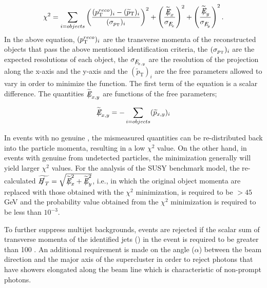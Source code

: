 \begin{equation}\label{eq:1ab}
   \chi^2 = \sum_{i=objects} \left( \frac{(\PT^{reco})_i-(\widetilde{p}_{\mathrm{T}})_i}{(\sigma_{\PT})_i} \right)^2 + \left( \frac{\widetilde{\Em}_x}{\sigma_{{\Em}_x}}\right)^2  + \left( \frac{\widetilde{\Em}_y}{\sigma_{{\Em}_y}}\right)^2.
\end{equation} 
In the above equation, $(p_{\mathrm{T}}^{reco})_{i}$ are the transverse  momenta of the reconstructed objects that pass the above mentioned identification criteria, the $(\sigma_{p_{\mathrm{T}}})_{i}$ are the expected resolutions of each object, the $\sigma_{{E\hspace{-0.6em}/}_{x,y}}$ are the resolution of the \met projection along the x-axis and the y-axis and the $(\widetilde{p}_{\mathrm T})_{i}$ are the free parameters allowed to vary in order to minimize the function. The first term of the equation is a scalar difference. The quantities $\widetilde{E\hspace{-0.6em}/}_{x,y}$ are functions of the free parameters;
  
\begin{eqnarray}
\widetilde{\Em}_{x,y} =  - \sum_{i=objects} (\widetilde{p}_{x,y})_i %
\end{eqnarray}

    In events with no genuine \met, the mismeasured quantities can be re-distributed back into the particle momenta, resulting in a low $\chi^{2}$ value. On the other hand, in events with genuine \met from undetected particles, the minimization generally will yield larger $\chi^{2}$ values. For the analysis of the SUSY benchmark model, the re-calculated $\widetilde{\met} = \sqrt{\widetilde{\Em}_{x}^2 + \widetilde{\Em}_{y}^2}$, i.e., in which the original object momenta are replaced with those obtained with the $\chi^{2}$ minimization, is required to be $ > 45$ GeV and the probability value obtained from the $\chi^{2}$ minimization is required to be less than $10^{-3}$. %

    To further suppress multijet backgrounds, events are rejected if the scalar sum of transverse momenta of the identified jets (\HT) in the event is required to be greater than 100 \GeV. An additional requirement is made on the angle ($\alpha$) between the beam direction and the major axis of the supercluster in order to reject photons that have showers elongated along the beam line which is characteristic of non-prompt photons. 

